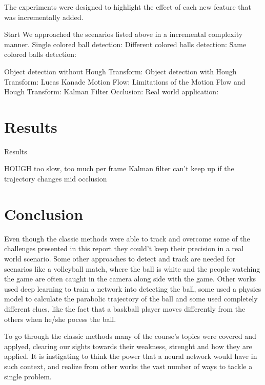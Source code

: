 \documentclass[10pt,twocolumn,letterpaper]{article}
\begin{document}
  The experiments were designed to highlight the effect of each new feature that
  was incrementally added.

  Start
  We approached the scenarios listed above in a incremental
complexity manner.
Single colored ball detection:
Different colored balls detection:
Same colored balls detection:

Object detection without Hough Transform:
Object detection with Hough Transform:
Lucas Kanade Motion Flow:
Limitations of the Motion Flow and Hough Transform:
Kalman Filter Occlusion:
Real world application:

\section{Results}

  Results

  HOUGH too slow, too much per frame
  Kalman filter can't keep up if the trajectory changes mid occlusion

\section{Conclusion}

  Even though the classic methods were able to track and overcome some of the
  challenges presented in this report they could't keep their precision in a real world
  scenario. Some other approaches to detect and track are needed for scenarios
  like a volleyball match, where the ball is white and the people watching the
  game are often caught in the camera along side with the game. Other works used deep
  learning to train a network into detecting the ball, some used a physics model
  to calculate the parabolic trajectory of the ball and some used completely
  different clues, like the fact that a baskball player moves differently from
  the others when he/she pocess the ball.

  To go through the classic methods many of the course's topics were covered and
  applyed, clearing our sights towards their weakness, strenght and how they are
  applied. It is instigating to think the power that a neural network would have
  in such context, and realize from other works the vast number of ways to
  tackle a single problem.

{\small


}
\end{document}
